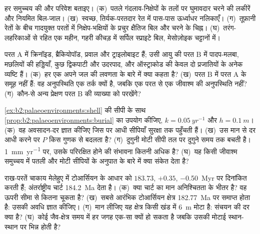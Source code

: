 \begin{exercise}[$\star$]\label{exo:b2:palaeoenvironments:3}
हर समुच्चय की  और परिवेश बताइए। (क)~पतले गंदलाव-निक्षेपों के तलों पर घुमावदार चरने की लकीरें और नियमित
बिल-जाल। (ख)~स्वच्छ, तिर्यक-परतदार रेत में पास-पास ऊर्ध्वाधर नलिकाएँ। (ग)~तूफ़ानी रेतों के बीच गादयुक्त
परतों में निक्षेप-भक्षियों के प्रचुर क्षैतिज बिल और चरने के चिह्न। (घ)~तरंग-लहरिकाओं से रहित एक महीन, गहरी कीचड़ में
सर्पिल स्प्राइटे बिल,
मेसोज़ोइक चट्टानों में।
\end{exercise}

\begin{exercise}[$\star$]\label{exo:b2:palaeoenvironments:4}
परत A में क्रिनॉइड, ब्रैकियोपॉड, प्रवाल और ट्राइलोबाइट हैं; उसी आयु की परत B में पादप-मलबा,
मछलियों की हड्डियाँ, कुछ द्विकपाटी और उदरपाद, और ऑस्ट्राकोड की केवल दो प्रजातियों के अनेक
व्यष्टि हैं। (क)~हर एक अपने जल की लवणता के बारे में क्या कहता है? (ख)~परत B में
परत A के समूह नहीं हैं: वह अनुपस्थिति एक तर्क क्यों है, जबकि एक परत से एक जीवाश्म की अनुपस्थिति नहीं?
(ग)~कौन-से अन्य प्रेक्षण परत B की व्याख्या को परखेंगे?
\end{exercise}

\begin{exercise}[$\star\star$]\label{exo:b2:palaeoenvironments:5}
\cref{ex:b2:palaeoenvironments:shell} की सीपी के साथ \cref{prop:b2:palaeoenvironments:burial}
का उपयोग कीजिए, $k = \qty{0.05}{yr^{-1}}$ और $h = \qty{0.1}{m}$। (क)~वह
अवसादन-दर ज्ञात कीजिए जिस पर आधी सीपियाँ सुरक्षा तक पहुँचती हैं। (ख)~उस मान से दर आधी करने पर $P$ किस
गुणक से बदलता है? (ग)~दुगुनी मोटी सीपी तल पर दुगुने समय तक बचती है।
\qty{1}{mm.yr^{-1}} पर, उसके परिरक्षित होने की संभावना कितनी अधिक है? (घ)~यह किसी जीवाश्म समुच्चय में
पतली और मोटी सीपियों के अनुपात के बारे में क्या संकेत देता है?
\end{exercise}

\begin{exercise}[$\star\star$]\label{exo:b2:palaeoenvironments:6}
राख-परतें चाकाय मेलेहुए में टोआर्सियन के आधार को $183.73$, $+0.35$, \qty{-0.50}{Myr} पर दिनांकित करती हैं;
अंतर्राष्ट्रीय चार्ट \qty{184.2}{Ma} देता है। (क)~क्या चार्ट का मान अनिश्चितता के भीतर है?
वह ऊपरी सीमा से कितना चूकता है? (ख)~सबसे आरंभिक टोआर्सियन क्षेत्र
\qty{182.77}{Ma} पर समाप्त होता है: उसकी अवधि ज्ञात कीजिए। (ग)~मान लीजिए यह क्षेत्र किसी खंड में \qty{6}{m} मोटा है:
संचयन की दर क्या है? (घ)~कोई जैव-क्षेत्र समय में हर जगह एक-सा क्यों हो सकता है जबकि उसकी
मोटाई स्थान-स्थान पर भिन्न होती है?
\end{exercise}

